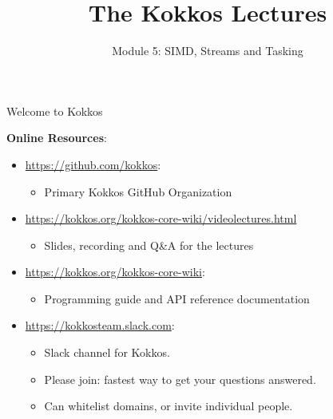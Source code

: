 
\def\sandid{SAND2020-8508 PE}

\title{The Kokkos Lectures}

\author{Module 5: SIMD, Streams and Tasking}




\shortfalse
\mediumtrue
\fulltrue
\notoverviewtrue



% 

\begin{frame}
	\titlepage
\end{frame}

\begin{frame}{Welcome to Kokkos}

\textbf{Online Resources}:

\begin{itemize}
        \item \url{https://github.com/kokkos}:
                \begin{itemize}
                        \item Primary Kokkos GitHub Organization
                \end{itemize}
        \item \url{https://kokkos.org/kokkos-core-wiki/videolectures.html}
                \begin{itemize}
			\item{Slides, recording and Q\&A for the lectures}
                \end{itemize}
        \item \url{https://kokkos.org/kokkos-core-wiki}:
                \begin{itemize}
                        \item Programming guide and API reference documentation
                \end{itemize}
        \item \url{https://kokkosteam.slack.com}:
                \begin{itemize}
                        \item Slack channel for Kokkos.
                        \item Please join: fastest way to get your questions answered.
                        \item Can whitelist domains, or invite individual people.
                \end{itemize}
\end{itemize}

\end{frame}


